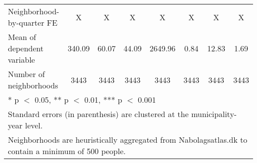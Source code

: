 \begin{tabular}[t]{lccccccc}
Neighborhood-by-quarter FE & X & X & X & X & X & X & X\\
Mean of dependent variable & 340.09 & 60.07 & 44.09 & 2649.96 & 0.84 & 12.83 & 1.69\\
Number of neighborhoods & 3443 & 3443 & 3443 & 3443 & 3443 & 3443 & 3443\\
\bottomrule
\multicolumn{8}{l}{\rule{0pt}{1em}* p $<$ 0.05, ** p $<$ 0.01, *** p $<$ 0.001}\\
\multicolumn{8}{l}{\rule{0pt}{1em}Standard errors (in parenthesis) are clustered at the municipality-year level.}\\
\multicolumn{8}{l}{\rule{0pt}{1em}Neighborhoods are heuristically aggregated from Nabolagsatlas.dk to contain a minimum of 500 people.}\\
\end{tabular}